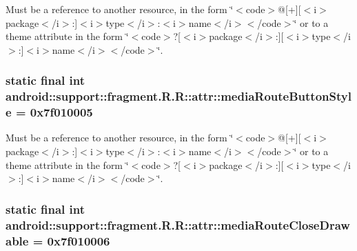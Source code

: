 Must be a reference to another resource, in the form \char`\"{}$<$code$>$@\mbox{[}+\mbox{]}\mbox{[}$<$i$>$package$<$/i$>$:\mbox{]}$<$i$>$type$<$/i$>$:$<$i$>$name$<$/i$>$$<$/code$>$\char`\"{} or to a theme attribute in the form \char`\"{}$<$code$>$?\mbox{[}$<$i$>$package$<$/i$>$:\mbox{]}\mbox{[}$<$i$>$type$<$/i$>$:\mbox{]}$<$i$>$name$<$/i$>$$<$/code$>$\char`\"{}. \hypertarget{classandroid_1_1support_1_1fragment_1_1_r_1_1attr_074b878c52f7814aac9899695568a04f}{
\subsubsection[{mediaRouteButtonStyle}]{\setlength{\rightskip}{0pt plus 5cm}static final int android::support::fragment.R.R::attr::mediaRouteButtonStyle = 0x7f010005}}
\label{classandroid_1_1support_1_1fragment_1_1_r_1_1attr_074b878c52f7814aac9899695568a04f}


Must be a reference to another resource, in the form \char`\"{}$<$code$>$@\mbox{[}+\mbox{]}\mbox{[}$<$i$>$package$<$/i$>$:\mbox{]}$<$i$>$type$<$/i$>$:$<$i$>$name$<$/i$>$$<$/code$>$\char`\"{} or to a theme attribute in the form \char`\"{}$<$code$>$?\mbox{[}$<$i$>$package$<$/i$>$:\mbox{]}\mbox{[}$<$i$>$type$<$/i$>$:\mbox{]}$<$i$>$name$<$/i$>$$<$/code$>$\char`\"{}. \hypertarget{classandroid_1_1support_1_1fragment_1_1_r_1_1attr_f0730fdd7a4e7b564c6a10ca2b88e748}{
\subsubsection[{mediaRouteCloseDrawable}]{\setlength{\rightskip}{0pt plus 5cm}static final int android::support::fragment.R.R::attr::mediaRouteCloseDrawable = 0x7f010006}}
\label{classandroid_1_1support_1_1fragment_1_1_r_1_1attr_f0730fdd7a4e7b564c6a10ca2b88e748}


